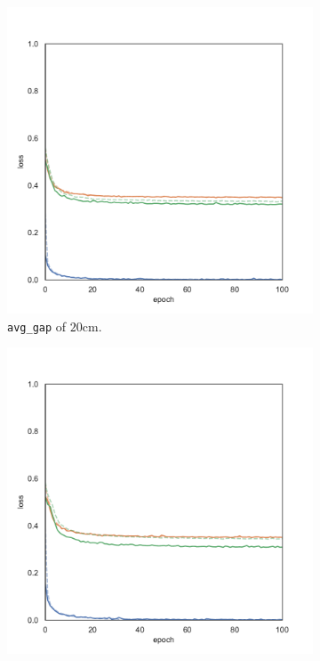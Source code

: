 \begin{figure}[!htb]
\begin{center}
\begin{subfigure}[h]{0.32\textwidth}
			\includegraphics[width=\textwidth]{contents/images/task2/loss-communication-gap_20}%
			\caption{\texttt{avg\_gap} of $20$\gls{cm}.}
		\end{subfigure}
		\hfill
		\begin{subfigure}[h]{0.32\textwidth}
			\includegraphics[width=\textwidth]{contents/images/task2/loss-communication-gap_var}

\end{subfigure}
\end{center}
\end{figure}
